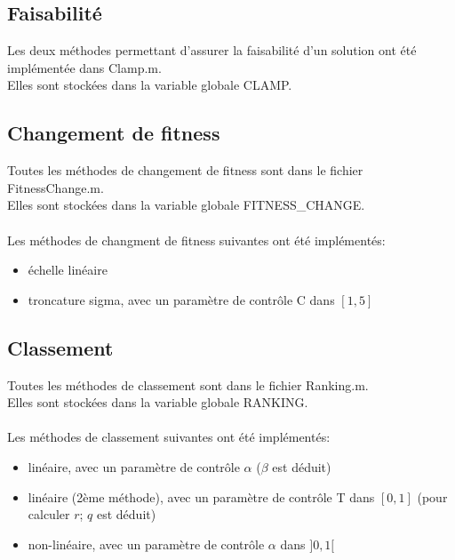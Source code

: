 \documentclass[12pt, letterpaper]{article}
\begin{document}
\subsection{Faisabilité}

Les deux méthodes permettant d'assurer la faisabilité d'un solution
ont été implémentée dans Clamp.m.\\
Elles sont stockées dans la variable globale CLAMP.

\subsection{Changement de fitness}

Toutes les méthodes de changement de fitness sont dans le fichier
\\\-FitnessChange.m.\\
Elles sont stockées dans la variable globale FITNESS\_CHANGE.
\\\\
Les méthodes de changment de fitness suivantes ont été implémentés:
\begin{itemize}
\item échelle linéaire\\
  
\item troncature sigma, avec un paramètre de contrôle C dans $[1, 5]$\\
\end{itemize}

\subsection{Classement}
Toutes les méthodes de classement sont dans le fichier Ranking.m.\\
Elles sont stockées dans la variable globale RANKING.
\\\\
Les méthodes de classement suivantes ont été implémentés:
\begin{itemize}
\item linéaire, avec un paramètre de contrôle $\alpha$ ($\beta$ est déduit)\\
  
\item linéaire (2ème méthode), avec un paramètre de contrôle T dans $[0, 1]$ (pour calculer $r$; $q$ est déduit)\\
  
\item non-linéaire, avec un paramètre de contrôle $\alpha$ dans $]0, 1[$\\
\end{itemize}
\end{document}
